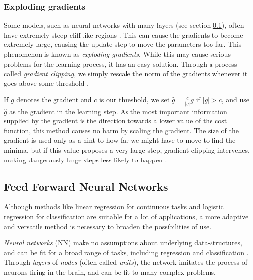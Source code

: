 \subsubsection{Exploding gradients}\label{sec:exploding_gradients}
Some models, such as neural networks with many layers (see section \ref{sec:nn}), often have extremely steep cliff-like regions \citep[p. 285]{Goodfellow-et-al-2016}.
This can cause the gradients to become extremely large, causing the update-step to move the parameters too far.
This phenomenon is known as \textit{exploding gradients}.
While this may cause serious problems for the learning process, it has an easy solution.
Through a process called \textit{gradient clipping}, we simply rescale the norm of the gradients whenever it goes above some threshold \citep[p. 93]{Ketkar2017}.

If $g$ denotes the gradient and $c$ is our threshold, we set $\hat{g} = \frac{c}{|g|}g$ if $|g|>c$, and use $\hat{g}$ as the gradient in the learning step.
As the most important information supplied by the gradient is the direction towards a lower value of the cost function, this method causes no harm by scaling the gradient.
The size of the gradient is used only as a hint to how far we might have to move to find the minima, but if this value proposes a very large step, gradient clipping intervenes, making dangerously large steps less likely to happen \citep[p. 286]{Goodfellow-et-al-2016}.

\subsection{Feed Forward Neural Networks}\label{sec:nn}
Although methods like linear regression for continuous tasks and logistic regression for classification are suitable for a lot of applications, a more adaptive and versatile method is necessary to broaden the possibilities of use. 

\textit{Neural networks} (NN) make no assumptions about underlying data-structures, and can be fit for a broad range of tasks, including regression and classification \citep[Neural networks]{morten}. Through \textit{layers} of \textit{nodes} (often called \textit{units}), the network imitates the process of neurons firing in the brain, and can be fit to many complex problems.


